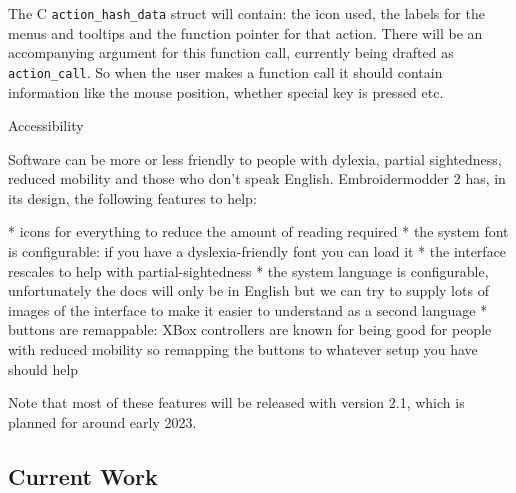 \documentclass[a4paper]{report}
\begin{document}
The C \texttt{action\_hash\_data} struct will contain: the icon used, the labels for the
menus and tooltips and the function pointer for that action.
There will be an accompanying argument for this function call, currently being
drafted as \texttt{action\_call}. So when the user makes a function call it should
contain information like the mouse position, whether special key is pressed
etc.

Accessibility
~~~~~~~~~~~~~

Software can be more or less friendly to people with dylexia, partial sightedness,
reduced mobility and those who don't speak English.
Embroidermodder 2 has, in its design, the following features to help:

* icons for everything to reduce the amount of reading required
* the system font is configurable: if you have a dyslexia-friendly font you can load it
* the interface rescales to help with partial-sightedness
* the system language is configurable, unfortunately the docs will only be in English but we can try to supply lots of images of the interface to make it easier to understand as a second language
* buttons are remappable: XBox controllers are known for being good for people with reduced mobility so remapping the buttons to whatever setup you have should help

Note that most of these features will be released with version 2.1, which is planned for around early 2023.

\subsection{Current Work}
\end{document}
